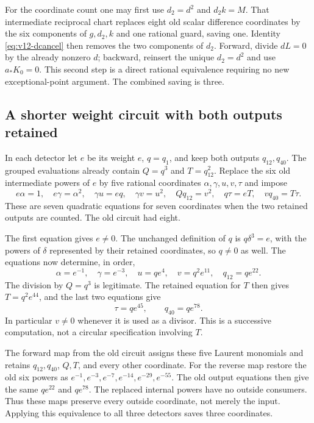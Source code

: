 For the coordinate count one may first use $d_2=d^2$ and $d_2k=M$.
That intermediate reciprocal chart replaces eight old scalar
difference coordinates by the six components of $g,d_2,k$ and one
rational guard, saving one.  Identity \eqref{eq:v12-dcancel} then removes
the two components of $d_2$.  Forward, divide $dL=0$ by the already
nonzero $d$; backward, reinsert the unique $d_2=d^2$ and use
$a_*K_0=0$.  This second step is a direct rational equivalence requiring
no new exceptional-point argument.  The combined saving is three.

\subsection{A shorter weight circuit with both outputs retained}
\label{subsec:v12-toric}

In each detector let $e$ be its weight $e$, $q=q_1$, and keep both
outputs $q_{12},q_{40}$.  The grouped evaluations already contain
$Q=q^3$ and $T=q_{12}^2$.  Replace the six old intermediate powers of
$e$ by five rational coordinates $\alpha,\gamma,u,v,\tau$ and impose
\begin{equation}\label{eq:v12-toric}
 e\alpha=1,\quad e\gamma=\alpha^2,\quad
 \gamma u=eq,\quad \gamma v=u^2,\quad
 Qq_{12}=v^2,\quad q\tau=eT,\quad vq_{40}=T\tau.
\end{equation}
These are seven quadratic equations for seven coordinates when the
two retained outputs are counted.  The old circuit had eight.

The first equation gives $e\ne0$.  The unchanged definition of $q$
is $q\delta^3=e$, with the powers of $\delta$ represented by their
retained coordinates, so $q\ne0$ as well.  The equations now determine,
in order,
\[
 \alpha=e^{-1},\quad\gamma=e^{-3},\quad
 u=qe^4,\quad v=q^2e^{11},\quad q_{12}=qe^{22}.
\]
The division by $Q=q^3$ is legitimate.  The retained equation for
$T$ then gives $T=q^2e^{44}$, and the last two equations give
\[
 \tau=qe^{45},\qquad q_{40}=qe^{78}.
\]
In particular $v\ne0$ whenever it is used as a divisor.  This is a
successive computation, not a circular specification involving $T$.

The forward map from the old circuit assigns these five Laurent
monomials and retains $q_{12},q_{40}$, $Q,T$, and every other coordinate.
For the reverse map restore the old six powers as
$e^{-1},e^{-3},e^{-7},e^{-14},e^{-29},e^{-55}$.  The old output equations
then give the same $qe^{22}$ and $qe^{78}$.  The replaced internal
powers have no outside consumers.  Thus these maps preserve every
outside coordinate, not merely the input.  Applying this equivalence
to all three detectors saves three coordinates.

